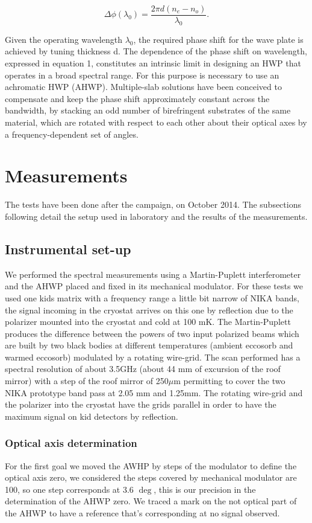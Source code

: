 \documentclass[a4paper,10pt]{article}
\begin{document}
				\begin{equation}
				\Delta \phi (\lambda_0) =\frac{2 \pi  d ( n_e - n_o )}{ \lambda_0 }.
				\end{equation}
				
Given the operating wavelength {$\lambda_0$}, the required phase shift for the wave plate is achieved by tuning thickness d.
The dependence of the phase shift on wavelength, expressed in equation 1, constitutes an intrinsic limit in designing an HWP that operates in a broad spectral range. For this purpose is necessary to use an achromatic HWP (AHWP).
Multiple-slab solutions have been conceived to compensate and keep the phase shift approximately constant across the bandwidth, by stacking an odd number of birefringent substrates of the same material, which are rotated with respect to each other about their optical axes by a frequency-dependent set of angles.
				
\section{Measurements}
The tests have been done after the campaign, on October 2014. The subsections following detail the setup used in laboratory and the results of the measurements.
\subsection{Instrumental set-up}
We performed the spectral measurements using a Martin-Puplett interferometer and the AHWP placed and fixed in its mechanical modulator. For these tests we used one kids matrix with a frequency range a little bit narrow of NIKA bands, the signal incoming in the cryostat arrives on this one by reflection due to the polarizer mounted into the cryostat and cold at 100 mK.
The Martin-Puplett produces the difference between the powers of two input polarized beams which are built by two black bodies at different temperatures (ambient eccosorb and warmed eccosorb) modulated by a rotating wire-grid. The scan performed has a spectral resolution of about 3.5GHz (about 44 mm of excursion of the roof mirror) with a step of the roof mirror of 250{$\mu$}m  permitting to cover the two NIKA prototype band pass at 2.05 mm and 1.25mm.
The rotating wire-grid and the polarizer into the cryostat have the grids parallel in order to have the maximum signal on kid detectors by reflection.
\subsubsection{Optical axis determination}For the first goal we moved the AWHP by steps of the modulator to define the optical axis zero, we considered the steps covered by mechanical modulator are 100, so one step corresponds at 3.6 {$\deg$}, this is our precision in the determination of the AHWP zero. We traced a mark on the not optical part of the AHWP to have a reference that's corresponding at no signal observed.
\end{document}
